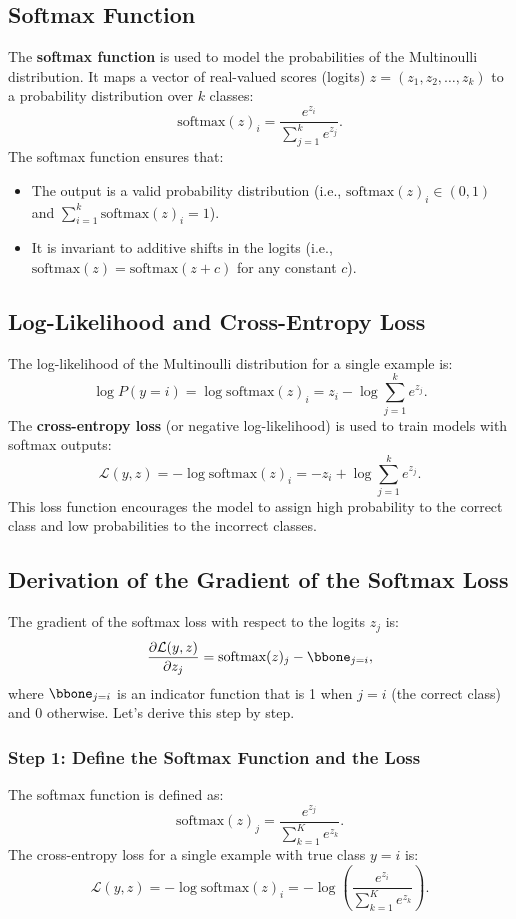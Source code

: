 \begin{notechapter}
\subsection{Softmax Function}
The \textbf{softmax function} is used to model the probabilities of the Multinoulli distribution. It maps a vector of real-valued scores (logits) \( z = (z_1, z_2, \dots, z_k) \) to a probability distribution over \( k \) classes:
\[
\text{softmax}(z)_i = \frac{e^{z_i}}{\sum_{j=1}^k e^{z_j}}.
\]
The softmax function ensures that:
\begin{itemize}
    \item The output is a valid probability distribution (i.e., \( \text{softmax}(z)_i \in (0, 1) \) and \( \sum_{i=1}^k \text{softmax}(z)_i = 1 \)).
    \item It is invariant to additive shifts in the logits (i.e., \( \text{softmax}(z) = \text{softmax}(z + c) \) for any constant \( c \)).
\end{itemize}

\subsection{Log-Likelihood and Cross-Entropy Loss}
The log-likelihood of the Multinoulli distribution for a single example is:
\[
\log P(y = i) = \log \text{softmax}(z)_i = z_i - \log \sum_{j=1}^k e^{z_j}.
\]
The \textbf{cross-entropy loss} (or negative log-likelihood) is used to train models with softmax outputs:
\[
\mathcal{L}(y, z) = -\log \text{softmax}(z)_i = -z_i + \log \sum_{j=1}^k e^{z_j}.
\]
This loss function encourages the model to assign high probability to the correct class and low probabilities to the incorrect classes.

\subsection{Derivation of the Gradient of the Softmax Loss}
The gradient of the softmax loss with respect to the logits \( z_j \) is:
\[
\frac{\partial \mathcal{L}(y, z)}{\partial z_j} = \text{softmax}(z)_j - \bbone_{j = i},
\]
where \( \bbone_{j = i} \) is an indicator function that is 1 when \( j = i \) (the correct class) and 0 otherwise. Let's derive this step by step.

\subsubsection{Step 1: Define the Softmax Function and the Loss}
The softmax function is defined as:
\[
\text{softmax}(z)_j = \frac{e^{z_j}}{\sum_{k=1}^K e^{z_k}}.
\]
The cross-entropy loss for a single example with true class \( y = i \) is:
\[
\mathcal{L}(y, z) = -\log \text{softmax}(z)_i = -\log \left( \frac{e^{z_i}}{\sum_{k=1}^K e^{z_k}} \right).
\]


\end{notechapter}
